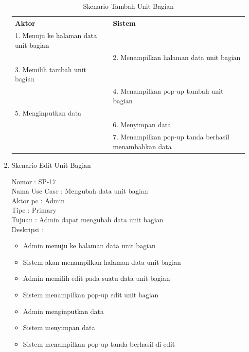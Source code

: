 \begin{enumerate}
\begin{table}
	\caption{Skenario Tambah Unit Bagian}
	\centering
	\begin{tabular}{ | p{55mm} | p{70mm} |}
		\hline 
		\textbf{Aktor} & \textbf{Sistem} \\
		\hline
		
		1.	Menuju ke halaman data unit bagian &  \\
		
		\hline
		
		&  2.	Menampilkan halaman data unit bagian \\
		
		\hline
		
		3. Memilih tambah unit bagian & \\
		
		\hline
		
		& 4.	Menampilkan pop-up tambah unit bagian \\
		
		\hline
		
		5.	Menginputkan data  & \\
		\hline
		
		& 6.	Menyimpan data \\
		\hline
		
		& 7.	Menampilkan pop-up tanda berhasil menambahkan data \\
		\hline
		
	\end{tabular}
\end{table}

\item Skenario Edit Unit Bagian

Nomor \kern 3.6pc : SP-17 \\
Nama Use Case : Mengubah data unit bagian \\
Aktor  pc : Admin \\
Tipe \kern 4.6pc : Primary \\
Tujuan \kern 3.6pc : Admin dapat mengubah data unit bagian \\
Deskripsi \kern 2.5pc : 

\begin{itemize}
	\item Admin menuju ke halaman data unit bagian
	\item Sistem akan menampilkan halaman data unit bagian
	\item Admin memilih edit pada suatu data unit bagian
	\item Sistem menampilkan pop-up edit unit bagian
	\item Admin menginputkan data
	\item Sistem menyimpan data
	\item Sistem menampilkan pop-up tanda berhasil di edit
	

\end{itemize}
\end{enumerate}
